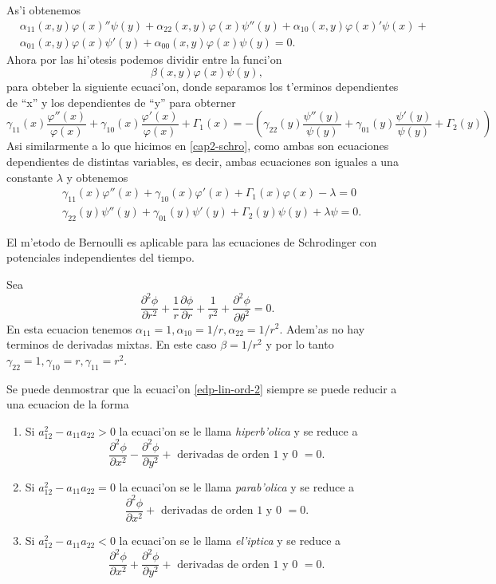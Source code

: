 \documentclass[main.tex]{subfiles}
\begin{document}
  As'i obtenemos
  \begin{align*}
    &\alpha_{11}(x,y)\varphi(x)''\psi(y)+\alpha_{22}(x,y)\varphi(x)\psi''(y)+\alpha_{10}(x,y)\varphi(x)'\psi(x)+\\
    &\alpha_{01}(x,y)\varphi(x)\psi'(y)+\alpha_{00}(x,y)\varphi(x)\psi(y)=0.
  \end{align*}
  Ahora por las hi'otesis podemos dividir entre la funci'on
  \[
    \beta(x,y)\varphi(x)\psi(y),
  \]
  para obteber la siguiente ecuaci'on, donde separamos los t'erminos dependientes de ``x'' y los dependientes de ``y'' para obterner
  \begin{equation}
    \gamma_{11}(x)\frac{\varphi''(x)}{\varphi(x)}+\gamma_{10}(x)\frac{\varphi'(x)}{\varphi(x)}+\Gamma_{1}(x)=
    -\left(\gamma_{22}(y)\frac{\psi''(y)}{\psi(y)}+\gamma_{01}(y)\frac{\psi'(y)}{\psi(y)}+\Gamma_{2}(y)\right)
  \end{equation}
  Asi similarmente a lo que hicimos en \ref{cap2-schro}, como ambas son ecuaciones dependientes de distintas variables, es decir, ambas ecuaciones son iguales a una constante $\lambda$ y obtenemos
  \begin{align*}
    &\gamma_{11}(x)\varphi''(x)+\gamma_{10}(x)\varphi'(x)+\Gamma_{1}(x)\varphi(x)-\lambda=0\\
    &\gamma_{22}(y)\psi''(y)+\gamma_{01}(y)\psi'(y)+\Gamma_{2}(y)\psi(y)+\lambda\psi=0.
  \end{align*}
  \QED

  \obs El m'etodo de Bernoulli es aplicable para las ecuaciones de Schrodinger con potenciales independientes del tiempo.

  \eje Sea
  \[
      \dfrac{\partial^{2}\phi}{\partial r^{2}}+\frac{1}{r}\dfrac{\partial\phi}{\partial r}+\frac{1}{r^{2}}+\dfrac{\partial^{2}\phi}{\partial\theta^{2}}=0.
    \]
    En esta ecuacion tenemos $\alpha_{11}=1,\alpha_{10}=1/r,\alpha_{22}=1/r^{2}$. Adem'as no hay terminos de derivadas mixtas. En este caso $\beta=1/r^{2}$ y por lo tanto $\gamma_{22}=1,\gamma_{10}=r,\gamma_{11}=r^{2}$.

    \obs Se puede denmostrar que la ecuaci'on \ref{edp-lin-ord-2} siempre se puede reducir a una ecuacion de la forma
    \begin{enumerate}
      \item Si $a^{2}_{12}-a_{11}a_{22}>0$ la ecuaci'on se le llama \emph{hiperb'olica} y se reduce a
            \[
            \dfrac{\partial^{2}\phi}{\partial x^{2}}-\dfrac{\partial^{2}\phi}{\partial y^{2}}+\text{ derivadas de orden 1 y 0 }=0.
            \]
      \item Si $a^{2}_{12}-a_{11}a_{22}=0$ la ecuaci'on se le llama \emph{parab'olica} y se reduce a
            \[
            \dfrac{\partial^{2}\phi}{\partial x^{2}}+\text{ derivadas de orden 1 y 0 }=0.
            \]
      \item Si $a^{2}_{12}-a_{11}a_{22}<0$ la ecuaci'on se le llama \emph{el'iptica} y se reduce a
            \[
            \dfrac{\partial^{2}\phi}{\partial x^{2}}+\dfrac{\partial^{2}\phi}{\partial y^{2}}+\text{ derivadas de orden 1 y 0 }=0.
            \]
    \end{enumerate}
\end{document}
